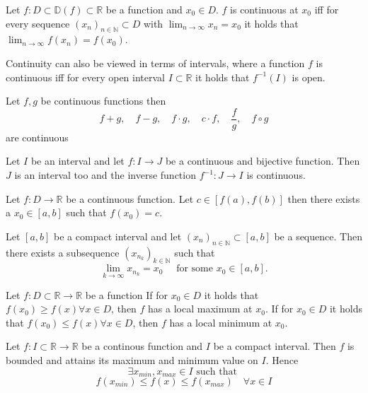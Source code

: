 \begin{theorem}
    Let $f: D \subset \mathbb{D}(f) \subset \mathbb{R}$ be a function and $x_0 \in D$. $f$ is continuous at $x_0$ iff for every sequence $(x_n)_{n\in\mathbb{N}} \subset D$ with $\lim_{n\to\infty} x_n = x_0$ it holds that $\lim_{n\to\infty} f(x_n) = f(x_0)$.
\end{theorem}

\begin{remark}
    Continuity can also be viewed in terms of intervals, where a function $f$ is continuous iff for every open interval $I \subset \mathbb{R}$ it holds that $f^{-1}(I)$ is open.
\end{remark}

\begin{lemma}
    Let $f, g$ be continuous functions then
    $$f+g, \quad f-g, \quad f \cdot g, \quad c \cdot f, \quad \frac{f}{g}, \quad f \circ g$$
    are continuous
\end{lemma}

\begin{theorem}
    Let $I$ be an interval and let $f: I \to J$ be a continuous and bijective function. Then $J$ is an interval too and the inverse function $f^{-1}: J \to I$ is continuous.
\end{theorem}

\begin{theorem}
    Let $f: D \to \mathbb{R}$ be a continuous function. Let $c \in [f(a), f(b)]$ then there exists a $x_0 \in [a, b]$ such that $f(x_0) = c$.
\end{theorem}

\begin{lemma}
    Let $[a, b]$ be a compact interval and let $(x_n)_{n\in\mathbb{N}} \subset [a, b]$ be a sequence. Then there exists a subsequence $(x_{n_k})_{k\in\mathbb{N}}$ such that 
    $$ \lim_{k\to\infty} x_{n_k} = x_0 \quad \text{ for some } x_0 \in [a, b]. $$
\end{lemma}

\begin{definition}
    Let $f: D \subset \mathbb{R} \to \mathbb{R}$ be a function
    If for $x_0 \in D$ it holds that $f(x_0) \geq f(x) \forall x \in D$, then $f$ has a local maximum at $x_0$.
    If for $x_0 \in D$ it holds that $f(x_0) \leq f(x) \forall x \in D$, then $f$ has a local minimum at $x_0$.
\end{definition}

\begin{theorem}
    Let $f: I \subset \mathbb{R} \to \mathbb{R}$ be a continous function and $I$ be a compact interval. Then $f$ is bounded and attains its maximum and minimum value on $I$. Hence
    $$\exists x_{min}, x_{max} \in I \text{ such that }$$
    $$ f(x_{min}) \leq f(x) \leq f(x_{max}) \quad \forall x \in I$$
\end{theorem}

